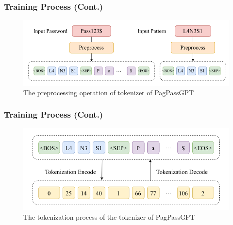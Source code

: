 \documentclass[
	12pt, %
]{beamer}
\begin{document}
\begin{frame}
	\frametitle{Training Process (Cont.)}
	
	\begin{figure}
		\centering
		\includegraphics[width=0.9\linewidth]{Images/img4}
		\caption{The preprocessing operation of tokenizer of PagPassGPT}
		\label{fig:The preprocessing operation of tokenizer of PagPassGPT}
	\end{figure}
\end{frame}




\begin{frame}
	\frametitle{Training Process (Cont.)}
	
	\begin{figure}
		\centering
		\includegraphics[width=0.9\linewidth]{Images/img5}
		\caption{The tokenization process of the tokenizer of PagPassGPT}
		\label{fig:The tokenization process of the tokenizer of PagPassGPT}
	\end{figure}
\end{frame}
\end{document}
